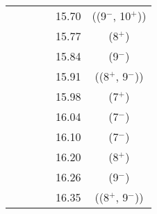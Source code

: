 \begin{center}
\begin{longtable}{cc cc cc}
  &   &   &   & 15.70 &   ((9$^-$, 10$^+$))       \\
  &   &   &   & 15.77 &   (8$^+$)                 \\
  &   &   &   & 15.84 &   (9$^-$)                 \\
  &   &   &   & 15.91 &   ((8$^+$, 9$^-$))        \\
  &   &   &   & 15.98 &   (7$^+$)                 \\
  &   &   &   & 16.04 &   (7$^-$)                 \\
  &   &   &   & 16.10 &   (7$^-$)                 \\
  &   &   &   & 16.20 &   (8$^+$)                 \\
  &   &   &   & 16.26 &   (9$^-$)                 \\
  &   &   &   & 16.35 &   ((8$^+$, 9$^-$))        \\

    \end{longtable}
\end{center}
